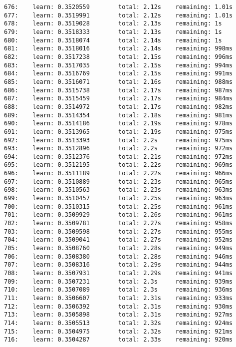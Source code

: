\documentclass[11pt]{article}
\begin{document}
\begin{Verbatim}[commandchars=\\\{\}]
676:    learn: 0.3520559        total: 2.12s    remaining: 1.01s
677:    learn: 0.3519991        total: 2.12s    remaining: 1.01s
678:    learn: 0.3519028        total: 2.13s    remaining: 1s
679:    learn: 0.3518333        total: 2.13s    remaining: 1s
680:    learn: 0.3518074        total: 2.14s    remaining: 1s
681:    learn: 0.3518016        total: 2.14s    remaining: 998ms
682:    learn: 0.3517238        total: 2.15s    remaining: 996ms
683:    learn: 0.3517035        total: 2.15s    remaining: 994ms
684:    learn: 0.3516769        total: 2.15s    remaining: 991ms
685:    learn: 0.3516071        total: 2.16s    remaining: 988ms
686:    learn: 0.3515738        total: 2.17s    remaining: 987ms
687:    learn: 0.3515459        total: 2.17s    remaining: 984ms
688:    learn: 0.3514972        total: 2.17s    remaining: 982ms
689:    learn: 0.3514354        total: 2.18s    remaining: 981ms
690:    learn: 0.3514186        total: 2.19s    remaining: 978ms
691:    learn: 0.3513965        total: 2.19s    remaining: 975ms
692:    learn: 0.3513393        total: 2.2s     remaining: 975ms
693:    learn: 0.3512896        total: 2.2s     remaining: 972ms
694:    learn: 0.3512376        total: 2.21s    remaining: 972ms
695:    learn: 0.3512195        total: 2.22s    remaining: 969ms
696:    learn: 0.3511189        total: 2.22s    remaining: 966ms
697:    learn: 0.3510889        total: 2.23s    remaining: 965ms
698:    learn: 0.3510563        total: 2.23s    remaining: 963ms
699:    learn: 0.3510457        total: 2.25s    remaining: 963ms
700:    learn: 0.3510315        total: 2.25s    remaining: 961ms
701:    learn: 0.3509929        total: 2.26s    remaining: 961ms
702:    learn: 0.3509781        total: 2.27s    remaining: 958ms
703:    learn: 0.3509598        total: 2.27s    remaining: 955ms
704:    learn: 0.3509041        total: 2.27s    remaining: 952ms
705:    learn: 0.3508760        total: 2.28s    remaining: 949ms
706:    learn: 0.3508380        total: 2.28s    remaining: 946ms
707:    learn: 0.3508316        total: 2.29s    remaining: 944ms
708:    learn: 0.3507931        total: 2.29s    remaining: 941ms
709:    learn: 0.3507231        total: 2.3s     remaining: 939ms
710:    learn: 0.3507089        total: 2.3s     remaining: 936ms
711:    learn: 0.3506607        total: 2.31s    remaining: 933ms
712:    learn: 0.3506392        total: 2.31s    remaining: 930ms
713:    learn: 0.3505898        total: 2.31s    remaining: 927ms
714:    learn: 0.3505513        total: 2.32s    remaining: 924ms
715:    learn: 0.3504975        total: 2.32s    remaining: 921ms
716:    learn: 0.3504287        total: 2.33s    remaining: 920ms

\end{Verbatim}
\end{document}
